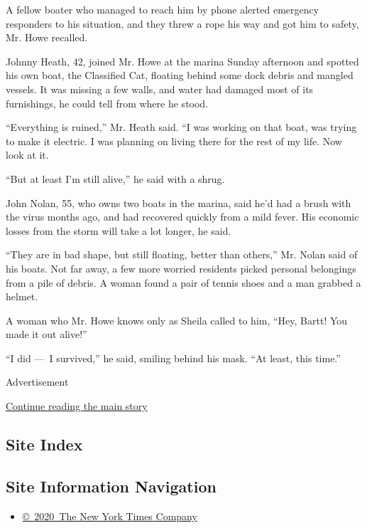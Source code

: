 A fellow boater who managed to reach him by phone alerted emergency
responders to his situation, and they threw a rope his way and got him
to safety, Mr. Howe recalled.

Johnny Heath, 42, joined Mr. Howe at the marina Sunday afternoon and
spotted his own boat, the Classified Cat, floating behind some dock
debris and mangled vessels. It was missing a few walls, and water had
damaged most of its furnishings, he could tell from where he stood.

``Everything is ruined,'' Mr. Heath said. ``I was working on that boat,
was trying to make it electric. I was planning on living there for the
rest of my life. Now look at it.

``But at least I'm still alive,'' he said with a shrug.

John Nolan, 55, who owns two boats in the marina, said he'd had a brush
with the virus months ago, and had recovered quickly from a mild fever.
His economic losses from the storm will take a lot longer, he said.

``They are in bad shape, but still floating, better than others,'' Mr.
Nolan said of his boats. Not far away, a few more worried residents
picked personal belongings from a pile of debris. A woman found a pair
of tennis shoes and a man grabbed a helmet.

A woman who Mr. Howe knows only as Sheila called to him, ``Hey, Bartt!
You made it out alive!''

``I did ---~I survived,'' he said, smiling behind his mask. ``At least,
this time.''

Advertisement

\protect\hyperlink{after-bottom}{Continue reading the main story}

\hypertarget{site-index}{%
\subsection{Site Index}\label{site-index}}

\hypertarget{site-information-navigation}{%
\subsection{Site Information
Navigation}\label{site-information-navigation}}

\begin{itemize}
\tightlist
\item
  \href{https://help.nytimes.com/hc/en-us/articles/115014792127-Copyright-notice}{©~2020~The
  New York Times Company}
\end{itemize}

